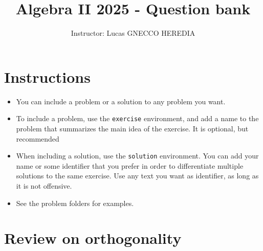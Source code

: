 \documentclass[11pt,a4paper]{article}
\title{\vspace{-1.2cm} Algebra II 2025 - Question bank} %
\author{Instructor: Lucas GNECCO HEREDIA}
\theoremstyle{break}
\begin{document}
\maketitle 
\thispagestyle{fancy}



\section*{Instructions}
\begin{itemize}[itemsep=0.05em]
    \item You can include a problem or a solution to any problem you want.
    \item To include a problem, use the \verb|exercise| environment, and add a name to the problem that summarizes the main idea of the exercise. It is optional, but recommended
    \item When including a solution, use the \verb|solution| environment. You can add your name or some identifier that you prefer in order to differentiate multiple solutions to the same exercise. Use any text you want as identifier, as long as it is not offensive.
    \item See the problem folders for examples.  
\end{itemize}




\section{Review on orthogonality}
















\end{document}
